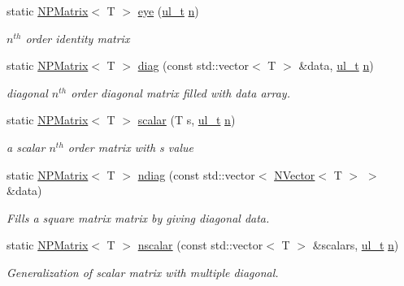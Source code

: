 \begin{DoxyCompactItemize}
static \mbox{\hyperlink{class_n_p_matrix}{N\+P\+Matrix}}$<$ T $>$ \mbox{\hyperlink{class_n_p_matrix_a38961696b973ca0ff6ac098580c6974f}{eye}} (\mbox{\hyperlink{typedef_8h_a1b140a2034db3f5dfe18a987745df43a}{ul\+\_\+t}} \mbox{\hyperlink{class_n_p_matrix_afc181b7652d9427125c72c38d7c1498d}{n}})
\begin{DoxyCompactList}\small\item\em $ n^{th} $ order identity matrix \end{DoxyCompactList}\item 
static \mbox{\hyperlink{class_n_p_matrix}{N\+P\+Matrix}}$<$ T $>$ \mbox{\hyperlink{class_n_p_matrix_ae73ef1ba99fe04c35af30adc3bfbd1dc}{diag}} (const std\+::vector$<$ T $>$ \&data, \mbox{\hyperlink{typedef_8h_a1b140a2034db3f5dfe18a987745df43a}{ul\+\_\+t}} \mbox{\hyperlink{class_n_p_matrix_afc181b7652d9427125c72c38d7c1498d}{n}})
\begin{DoxyCompactList}\small\item\em diagonal $ n^{th} $ order diagonal matrix filled with data array. \end{DoxyCompactList}\item 
static \mbox{\hyperlink{class_n_p_matrix}{N\+P\+Matrix}}$<$ T $>$ \mbox{\hyperlink{class_n_p_matrix_a3195b8dd4a279c3018122c3053997f8c}{scalar}} (T s, \mbox{\hyperlink{typedef_8h_a1b140a2034db3f5dfe18a987745df43a}{ul\+\_\+t}} \mbox{\hyperlink{class_n_p_matrix_afc181b7652d9427125c72c38d7c1498d}{n}})
\begin{DoxyCompactList}\small\item\em a scalar $ n^{th} $ order matrix with {\ttfamily s} value \end{DoxyCompactList}\item 
static \mbox{\hyperlink{class_n_p_matrix}{N\+P\+Matrix}}$<$ T $>$ \mbox{\hyperlink{class_n_p_matrix_a16aa6a18c33005300049ab1a39cbfbc2}{ndiag}} (const std\+::vector$<$ \mbox{\hyperlink{class_n_vector}{N\+Vector}}$<$ T $>$ $>$ \&data)
\begin{DoxyCompactList}\small\item\em Fills a square matrix matrix by giving diagonal data. \end{DoxyCompactList}\item 
static \mbox{\hyperlink{class_n_p_matrix}{N\+P\+Matrix}}$<$ T $>$ \mbox{\hyperlink{class_n_p_matrix_aa2540f387990e3db6551bd88bc5d43d9}{nscalar}} (const std\+::vector$<$ T $>$ \&scalars, \mbox{\hyperlink{typedef_8h_a1b140a2034db3f5dfe18a987745df43a}{ul\+\_\+t}} \mbox{\hyperlink{class_n_p_matrix_afc181b7652d9427125c72c38d7c1498d}{n}})
\begin{DoxyCompactList}\small\item\em Generalization of scalar matrix with multiple diagonal. \end{DoxyCompactList}\end{DoxyCompactItemize}
